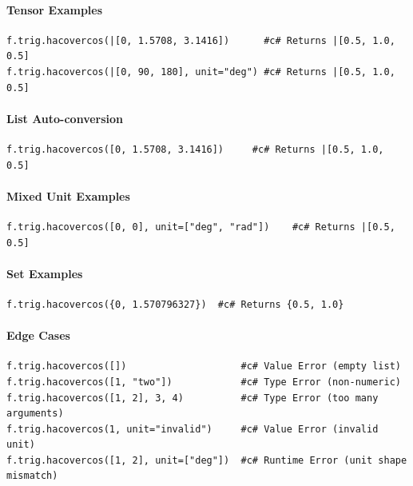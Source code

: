 \paragraph{Tensor Examples}
\begin{verbatim}
f.trig.hacovercos(|[0, 1.5708, 3.1416])      #c# Returns |[0.5, 1.0, 0.5]
f.trig.hacovercos(|[0, 90, 180], unit="deg") #c# Returns |[0.5, 1.0, 0.5]
\end{verbatim}

\paragraph{List Auto-conversion}
\begin{verbatim}
f.trig.hacovercos([0, 1.5708, 3.1416])     #c# Returns |[0.5, 1.0, 0.5]
\end{verbatim}

\paragraph{Mixed Unit Examples}
\begin{verbatim}
f.trig.hacovercos([0, 0], unit=["deg", "rad"])    #c# Returns |[0.5, 0.5]
\end{verbatim}

\paragraph{Set Examples}
\begin{verbatim}
f.trig.hacovercos({0, 1.570796327})  #c# Returns {0.5, 1.0}
\end{verbatim}

\paragraph{Edge Cases}
\begin{verbatim}
f.trig.hacovercos([])                    #c# Value Error (empty list)
f.trig.hacovercos([1, "two"])            #c# Type Error (non-numeric)
f.trig.hacovercos([1, 2], 3, 4)          #c# Type Error (too many arguments)
f.trig.hacovercos(1, unit="invalid")     #c# Value Error (invalid unit)
f.trig.hacovercos([1, 2], unit=["deg"])  #c# Runtime Error (unit shape mismatch)
\end{verbatim}

